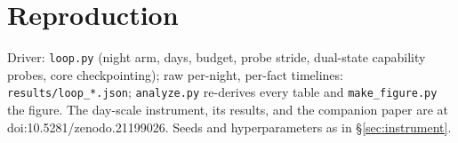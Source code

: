 \documentclass[11pt]{article}
\begin{document}
\appendix
\section{Reproduction}
Driver: \texttt{loop.py} (night arm, days, budget, probe stride, dual-state capability probes,
core checkpointing); raw per-night, per-fact timelines: \texttt{results/loop\_*.json};
\texttt{analyze.py} re-derives every table and \texttt{make\_figure.py} the figure. The day-scale instrument, its results,
and the companion paper are at doi:10.5281/zenodo.21199026. Seeds and hyperparameters as in
\S\ref{sec:instrument}.
\end{document}

